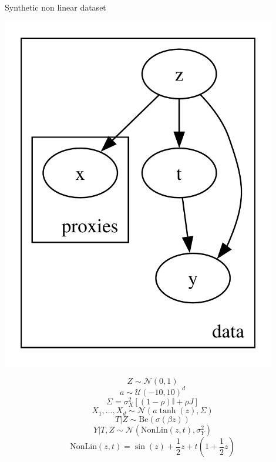 \documentclass[10pt]{beamer}
\begin{document}
\begin{frame}{Synthetic non linear dataset}
    \begin{minipage}{0.48\textwidth}
    \includegraphics[width=0.9\textwidth]{images/pyro_model.pdf}
    \end{minipage}
    \begin{minipage}{0.48\textwidth}
    
        \begin{equation*}
        Z \sim \mathcal{N}(0,1)
        \end{equation*}
        \begin{equation*}
            a \sim \mathcal{U}(-10,10)^d
        \end{equation*}
        \begin{equation*}
        \Sigma=\sigma_X^2[(1-\rho) \mathbb{I}+\rho J]    
        \end{equation*}
        \begin{equation*}
        X_1,...,X_d \sim \mathcal{N}(a\tanh(z),\Sigma)     
        \end{equation*}
        \begin{equation*}
        T | Z \sim \text{Be}(\sigma(\beta z))    
        \end{equation*}
        \begin{equation*}
        Y|T,Z \sim \mathcal{N}\left(\text{NonLin}(z,t),\sigma_Y^2\right)           
        \end{equation*}
        \begin{equation*}
        \text{NonLin}(z,t) = \sin(z)+\frac12z+t\left(1+\frac12z\right)      
        \end{equation*}
    \end{minipage}
    
\end{frame}
\end{document}
